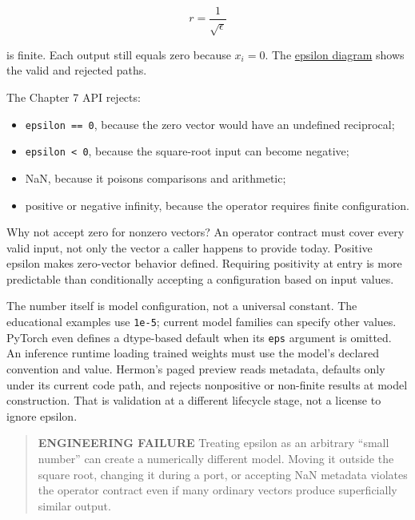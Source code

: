 \begin{equation}
r=\frac{1}{\sqrt{\epsilon}}
\end{equation}

is finite. Each output still equals zero because \(x_i=0\). The
\href{https://github.com/hermonai/inside-the-llm-engine/blob/astra-visual-rewrite/diagrams/transformer/epsilon-zero-vector.txt}{epsilon
diagram} shows the valid and rejected paths.

The Chapter 7 API rejects:

\begin{itemize}
\tightlist
\item
  \texttt{epsilon\ ==\ 0}, because the zero vector would have an
  undefined reciprocal;
\item
  \texttt{epsilon\ \textless{}\ 0}, because the square-root input can
  become negative;
\item
  NaN, because it poisons comparisons and arithmetic;
\item
  positive or negative infinity, because the operator requires finite
  configuration.
\end{itemize}

Why not accept zero for nonzero vectors? An operator contract must cover
every valid input, not only the vector a caller happens to provide
today. Positive epsilon makes zero-vector behavior defined. Requiring
positivity at entry is more predictable than conditionally accepting a
configuration based on input values.

The number itself is model configuration, not a universal constant. The
educational examples use \texttt{1e-5}; current model families can
specify other values. PyTorch even defines a dtype-based default when
its \texttt{eps} argument is omitted. An inference runtime loading
trained weights must use the model's declared convention and value.
Hermon's paged preview reads
\texttt{} metadata,
defaults only under its current code path, and rejects nonpositive or
non-finite results at model construction. That is validation at a
different lifecycle stage, not a license to ignore epsilon.

\begin{quote}
\textbf{ENGINEERING FAILURE} Treating epsilon as an arbitrary ``small
number'' can create a numerically different model. Moving it outside the
square root, changing it during a port, or accepting NaN metadata
violates the operator contract even if many ordinary vectors produce
superficially similar output.
\end{quote}

